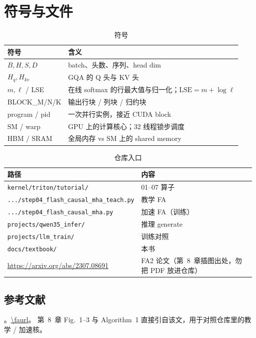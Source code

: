 \chapter{符号与文件}

\begin{table}[htbp]
  \centering
  \caption{符号}
  \begin{tabular}{ll}
    \toprule
    符号 & 含义 \\
    \midrule
    $B,H,S,D$ & batch、头数、序列、head dim \\
    $H_q,H_{kv}$ & GQA 的 Q 头与 KV 头 \\
    $m,\ell$ / LSE & 在线 softmax 的行最大值与归一化；$\mathrm{LSE}=m+\log\ell$ \\
    BLOCK\_M/N/K & 输出行块 / 列块 / 归约块 \\
    program / pid & 一次并行实例，接近 CUDA block \\
    SM / warp & GPU 上的计算核心；32 线程锁步调度 \\
    HBM / SRAM & 全局内存 vs SM 上的 shared memory \\
    \bottomrule
  \end{tabular}
\end{table}

\begin{table}[htbp]
  \centering
  \caption{仓库入口}
  \begin{tabular}{ll}
    \toprule
    路径 & 内容 \\
    \midrule
    \texttt{kernel/triton/tutorial/} & 01--07 算子 \\
    \texttt{.../step04\_flash\_causal\_mha\_teach.py} & 教学 FA \\
    \texttt{.../step04\_flash\_causal\_mha.py} & 加速 FA（训练） \\
    \texttt{projects/qwen35\_infer/} & 推理 generate \\
    \texttt{projects/llm\_train/} & 训练对照 \\
    \texttt{docs/textbook/} & 本书 \\
    \url{https://arxiv.org/abs/2307.08691} & FA2 论文（第~8~章插图出处，勿把 PDF 放进仓库） \\
    \bottomrule
  \end{tabular}
\end{table}

\section*{参考文献}

\noindent\facite。\url{\faurl}。
第~8~章 Fig.~1--3 与 Algorithm~1 直接引自该文，用于对照仓库里的教学 / 加速核。
